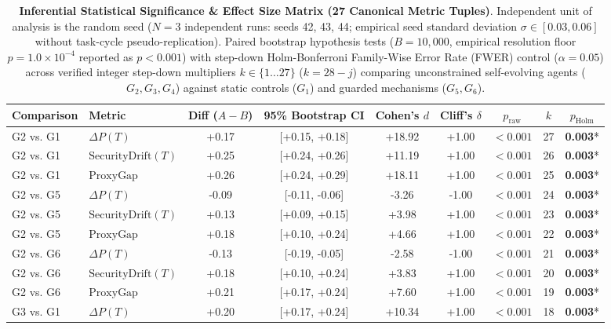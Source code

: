 \begin{table}[t]
\centering
\small
\caption{\textbf{Inferential Statistical Significance & Effect Size Matrix (27 Canonical Metric Tuples)}. Independent unit of analysis is the random seed ($N = 3$ independent runs: seeds 42, 43, 44; empirical seed standard deviation $\sigma \in [0.03, 0.06]$ without task-cycle pseudo-replication). Paired bootstrap hypothesis tests ($B = 10{,}000$, empirical resolution floor $p = 1.0 \times 10^{-4}$ reported as $p < 0.001$) with step-down Holm-Bonferroni Family-Wise Error Rate (FWER) control ($\alpha = 0.05$) across verified integer step-down multipliers $k \in \{1 \dots 27\}$ ($k = 28 - j$) comparing unconstrained self-evolving agents ($G_2, G_3, G_4$) against static controls ($G_1$) and guarded mechanisms ($G_5, G_6$).}
\label{tab:significance_testing}
\begin{tabular}{llccccccc}
\toprule
\textbf{Comparison} & \textbf{Metric} & \textbf{Diff ($A - B$)} & \textbf{95\% Bootstrap CI} & \textbf{Cohen's $d$} & \textbf{Cliff's $\delta$} & \textbf{$p_{\text{raw}}$} & \textbf{$k$} & \textbf{$p_{\text{Holm}}$} \\
\midrule
G2 vs. G1 & $\Delta P(T)$ & +0.17 & [+0.15, +0.18] & +18.92 & +1.00 & $<0.001$ & 27 & \textbf{0.003}* \\
G2 vs. G1 & $\text{SecurityDrift}(T)$ & +0.25 & [+0.24, +0.26] & +11.19 & +1.00 & $<0.001$ & 26 & \textbf{0.003}* \\
G2 vs. G1 & $\text{ProxyGap}$ & +0.26 & [+0.24, +0.29] & +18.11 & +1.00 & $<0.001$ & 25 & \textbf{0.003}* \\
G2 vs. G5 & $\Delta P(T)$ & -0.09 & [-0.11, -0.06] & -3.26 & -1.00 & $<0.001$ & 24 & \textbf{0.003}* \\
G2 vs. G5 & $\text{SecurityDrift}(T)$ & +0.13 & [+0.09, +0.15] & +3.98 & +1.00 & $<0.001$ & 23 & \textbf{0.003}* \\
G2 vs. G5 & $\text{ProxyGap}$ & +0.18 & [+0.10, +0.24] & +4.66 & +1.00 & $<0.001$ & 22 & \textbf{0.003}* \\
G2 vs. G6 & $\Delta P(T)$ & -0.13 & [-0.19, -0.05] & -2.58 & -1.00 & $<0.001$ & 21 & \textbf{0.003}* \\
G2 vs. G6 & $\text{SecurityDrift}(T)$ & +0.18 & [+0.10, +0.24] & +3.83 & +1.00 & $<0.001$ & 20 & \textbf{0.003}* \\
G2 vs. G6 & $\text{ProxyGap}$ & +0.21 & [+0.17, +0.24] & +7.60 & +1.00 & $<0.001$ & 19 & \textbf{0.003}* \\
G3 vs. G1 & $\Delta P(T)$ & +0.20 & [+0.17, +0.24] & +10.34 & +1.00 & $<0.001$ & 18 & \textbf{0.003}* \\

\end{tabular}
\end{table}
